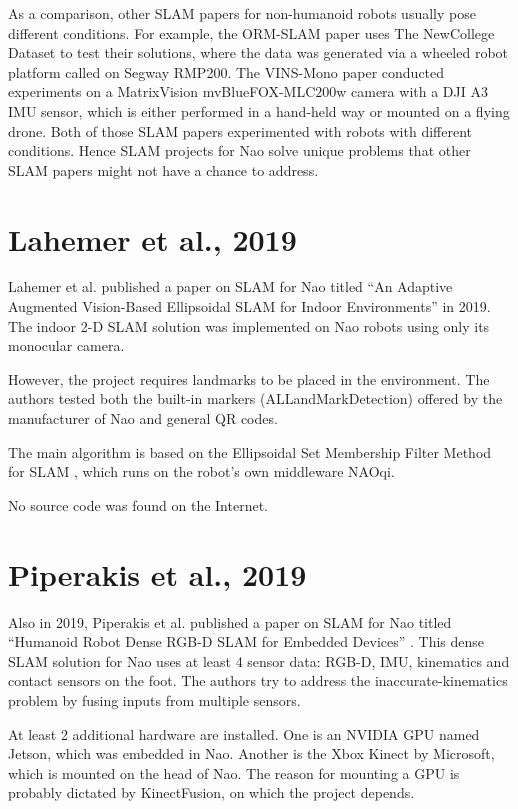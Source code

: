 \documentclass[11pt]{amsart}
\begin{document}
As a comparison, other SLAM papers for non-humanoid robots usually pose different conditions. For example, the ORM-SLAM paper \cite{mur2015orb} uses The NewCollege Dataset to test their solutions, where the data was generated via a wheeled robot platform called on Segway RMP200. The VINS-Mono paper \cite{qin2018vins} conducted experiments on a MatrixVision mvBlueFOX-MLC200w camera with a DJI A3 IMU sensor, which is either performed in a hand-held way or mounted on a flying drone. Both of those SLAM papers experimented with robots with different conditions. Hence SLAM projects for Nao solve unique problems that other SLAM papers might not have a chance to address.


\section{Lahemer et al., 2019}

Lahemer et al. published a paper on SLAM for Nao titled ``An Adaptive Augmented Vision-Based Ellipsoidal SLAM for Indoor Environments'' \cite{lahemer2019adaptive} in 2019. The indoor 2-D SLAM solution was implemented on Nao robots using only its monocular camera. 

However, the project requires landmarks to be placed in the environment. The authors tested both the built-in markers (ALLandMarkDetection) offered by the manufacturer of Nao and general QR codes. 

The main algorithm is based on the Ellipsoidal Set Membership Filter Method for SLAM \cite{scholte2003nonlinear}, which runs on the robot's own middleware NAOqi.

No source code was found on the Internet.

\section{Piperakis et al., 2019}

Also in 2019, Piperakis et al. published a paper on SLAM for Nao titled ``Humanoid Robot Dense RGB-D SLAM for Embedded Devices'' \cite{piperakis2019}. This dense SLAM solution for Nao uses at least 4 sensor data: RGB-D, IMU, kinematics and contact sensors on the foot. The authors try to address the inaccurate-kinematics problem by fusing inputs from multiple sensors.

At least 2 additional hardware are installed. One is an NVIDIA GPU named Jetson, which was embedded in Nao. Another is the Xbox Kinect by Microsoft, which is mounted on the head of Nao. The reason for mounting a GPU is probably dictated by KinectFusion, on which the project depends.
\end{document}
